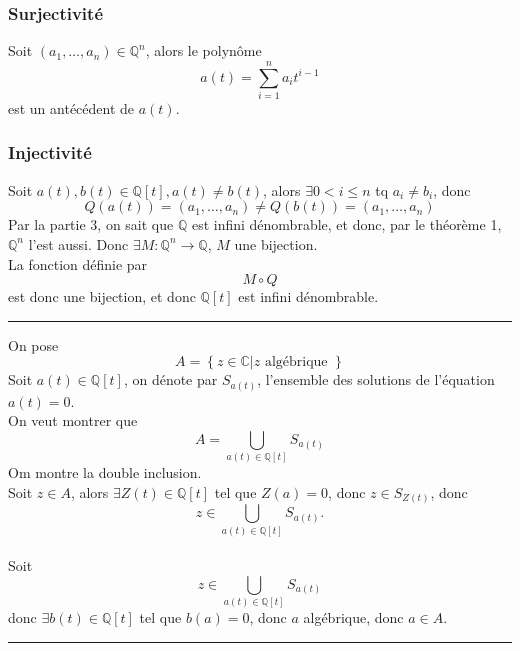 \documentclass[11pt, a4paper, twoside]{article}
\newcommand\hr{
    \noindent\rule[0.5ex]{\linewidth}{0.5pt}\newline
}
\begin{document}
\subsubsection*{Surjectivité}
Soit $(a_1,\ldots, a_n) \in \mathbb{Q}^{n}$, alors le polynôme
\[ 
	a(t) = \sum_{i=1}^{n} a_i t^{i-1}
\]
est un antécédent de $a(t)$.
\subsubsection*{Injectivité}
Soit $a(t), b(t) \in \mathbb{Q}[t], a(t) \neq b(t)$, alors $\exists 0<i \leq n$ tq $a_i \neq b_i$, donc
\[ 
	Q(a(t)) = ( a_1, \ldots, a_n) \neq Q(b(t)) = ( a_1, \ldots, a_n)
\]
Par la partie 3, on sait que $\mathbb{Q}$ est infini dénombrable, et donc, par le théorème 1, $\mathbb{Q}^{n}$ l'est aussi. Donc $\exists M: \mathbb{Q}^{n} \to \mathbb{Q}$, $M$ une bijection.\\
La fonction définie par
\[ 
M \circ Q
\]
est donc une bijection, et donc $\mathbb{Q}[t]$ est infini dénombrable.\\
\hr
On pose
\[ 
A = \left\{ z \in \mathbb{C} | z \text{ algébrique }  \right\}
\]
Soit $a(t) \in \mathbb{Q}[t]$, on dénote par $S_{a(t)}$, l'ensemble des solutions de l'équation $a(t)=0$.\\
On veut montrer que 
\[ 
	A = \bigcup_{a(t) \in \mathbb{Q}[t]} S_{a(t)} 
\]
Om montre la double inclusion.\\
Soit $z \in A$, alors $\exists Z(t) \in \mathbb{Q}[t]$ tel que $Z(a)=0$, donc $z \in S_{Z(t)} $, donc 
$$z \in \bigcup_{a(t) \in \mathbb{Q}[t]} S_{a(t)}. $$\\
Soit
$$z \in \bigcup_{a(t) \in \mathbb{Q}[t]} S_{a(t)}  $$
donc $\exists b(t) \in \mathbb{Q}[t]$ tel que $b(a)=0$, donc $a$ algébrique, donc $a \in A$.\\
\hr
\end{document}
